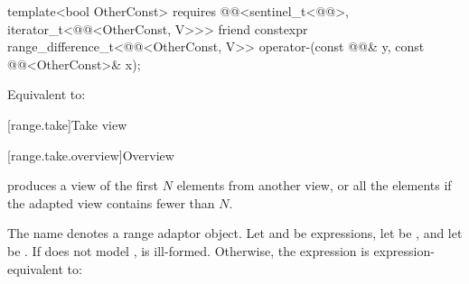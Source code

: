 %
\begin{itemdecl}
template<bool OtherConst>
  requires @@<sentinel_t<@@>, iterator_t<@@<OtherConst, V>>>
friend constexpr range_difference_t<@@<OtherConst, V>>
  operator-(const @@& y, const @@<OtherConst>& x);
\end{itemdecl}

\begin{itemdescr}
\pnum
\effects
Equivalent to: 
\end{itemdescr}

[range.take]{Take view}

[range.take.overview]{Overview}

\pnum
{} produces a view of the first $N$ elements
from another view, or all the elements if the adapted
view contains fewer than $N$.

\pnum
{}%
The name  denotes a
range adaptor object.
Let  and  be expressions,
let  be , and
let  be .
If  does not model
,
 is ill-formed.
Otherwise, the expression 
is expression-equivalent to:

